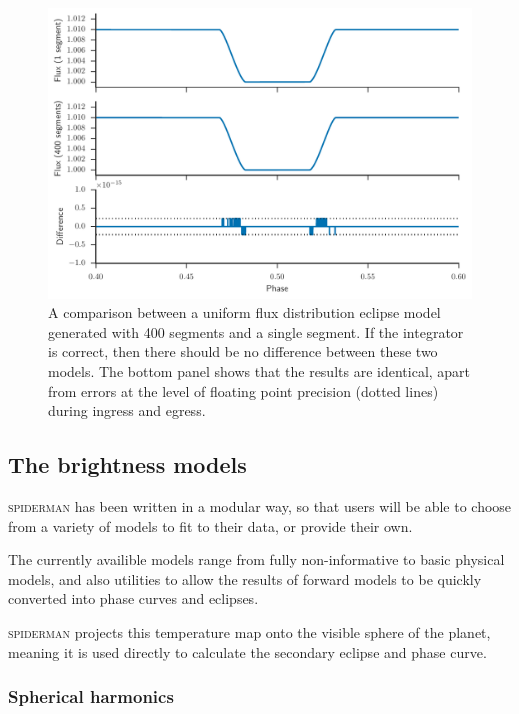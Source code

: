 \documentclass[a4paper,fleqn,usenatbib]{mnras}
\begin{document}
\begin{figure}
\begin{center}
\includegraphics[width=\columnwidth]{img/precision.pdf}
\caption{A comparison between a uniform flux distribution eclipse model generated with 400 segments and a single segment. If the integrator is correct, then there should be no difference between these two models. The bottom panel shows that the results are identical, apart from errors at the level of floating point precision (dotted lines) during ingress and egress.}
\label{fig:precision}
\end{center}
\end{figure}

\subsection{The brightness models}\label{sec:temp model}

\textsc{spiderman} has been written in a modular way, so that users will be able to choose from a variety of models to fit to their data, or provide their own. 

The currently availible models range from fully non-informative to basic physical models, and also utilities to allow the results of forward models to be quickly converted into phase curves and eclipses.

\textsc{spiderman} projects this temperature map onto the visible sphere of the planet, meaning it is used directly to calculate the secondary eclipse and phase curve. 

\subsubsection{Spherical harmonics}
\end{document}
